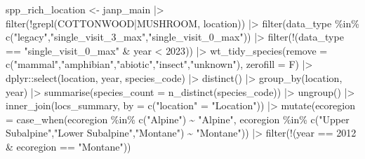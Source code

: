 \documentclass[
  letterpaper,
  DIV=11,
  numbers=noendperiod]{scrartcl}
\newenvironment{Shaded}{\begin{snugshade}}{\end{snugshade}}
\newcommand{\AttributeTok}[1]{\textcolor[rgb]{0.40,0.45,0.13}{#1}}
\newcommand{\DecValTok}[1]{\textcolor[rgb]{0.68,0.00,0.00}{#1}}
\newcommand{\FunctionTok}[1]{\textcolor[rgb]{0.28,0.35,0.67}{#1}}
\newcommand{\NormalTok}[1]{\textcolor[rgb]{0.00,0.23,0.31}{#1}}
\newcommand{\OtherTok}[1]{\textcolor[rgb]{0.00,0.23,0.31}{#1}}
\newcommand{\SpecialCharTok}[1]{\textcolor[rgb]{0.37,0.37,0.37}{#1}}
\newcommand{\StringTok}[1]{\textcolor[rgb]{0.13,0.47,0.30}{#1}}
\begin{document}
\begin{Shaded}
\begin{Highlighting}[]
\NormalTok{spp\_rich\_location }\OtherTok{\textless{}{-}}\NormalTok{ janp\_main }\SpecialCharTok{|\textgreater{}}
  \FunctionTok{filter}\NormalTok{(}\SpecialCharTok{!}\FunctionTok{grepl}\NormalTok{(}\StringTok{\textquotesingle{}COTTONWOOD|MUSHROOM\textquotesingle{}}\NormalTok{, location)) }\SpecialCharTok{|\textgreater{}}
  \FunctionTok{filter}\NormalTok{(data\_type }\SpecialCharTok{\%in\%} \FunctionTok{c}\NormalTok{(}\StringTok{"legacy"}\NormalTok{,}\StringTok{"single\_visit\_3\_max"}\NormalTok{,}\StringTok{"single\_visit\_0\_max"}\NormalTok{)) }\SpecialCharTok{|\textgreater{}}
  \FunctionTok{filter}\NormalTok{(}\SpecialCharTok{!}\NormalTok{(data\_type }\SpecialCharTok{==} \StringTok{"single\_visit\_0\_max"} \SpecialCharTok{\&}\NormalTok{ year }\SpecialCharTok{\textless{}} \DecValTok{2023}\NormalTok{)) }\SpecialCharTok{|\textgreater{}}
  \FunctionTok{wt\_tidy\_species}\NormalTok{(}\AttributeTok{remove =} \FunctionTok{c}\NormalTok{(}\StringTok{"mammal"}\NormalTok{,}\StringTok{"amphibian"}\NormalTok{,}\StringTok{"abiotic"}\NormalTok{,}\StringTok{"insect"}\NormalTok{,}\StringTok{"unknown"}\NormalTok{), }\AttributeTok{zerofill =}\NormalTok{ F) }\SpecialCharTok{|\textgreater{}}
\NormalTok{  dplyr}\SpecialCharTok{::}\FunctionTok{select}\NormalTok{(location, year, species\_code) }\SpecialCharTok{|\textgreater{}}
  \FunctionTok{distinct}\NormalTok{() }\SpecialCharTok{|\textgreater{}}
  \FunctionTok{group\_by}\NormalTok{(location, year) }\SpecialCharTok{|\textgreater{}}
  \FunctionTok{summarise}\NormalTok{(}\AttributeTok{species\_count =} \FunctionTok{n\_distinct}\NormalTok{(species\_code)) }\SpecialCharTok{|\textgreater{}}
  \FunctionTok{ungroup}\NormalTok{() }\SpecialCharTok{|\textgreater{}}
  \FunctionTok{inner\_join}\NormalTok{(locs\_summary, }\AttributeTok{by =} \FunctionTok{c}\NormalTok{(}\StringTok{"location"} \OtherTok{=} \StringTok{"Location"}\NormalTok{)) }\SpecialCharTok{|\textgreater{}}
  \FunctionTok{mutate}\NormalTok{(}\AttributeTok{ecoregion =} \FunctionTok{case\_when}\NormalTok{(ecoregion }\SpecialCharTok{\%in\%} \FunctionTok{c}\NormalTok{(}\StringTok{"Alpine"}\NormalTok{) }\SpecialCharTok{\textasciitilde{}} \StringTok{"Alpine"}\NormalTok{,}
\NormalTok{                               ecoregion }\SpecialCharTok{\%in\%} \FunctionTok{c}\NormalTok{(}\StringTok{"Upper Subalpine"}\NormalTok{,}\StringTok{"Lower Subalpine"}\NormalTok{,}\StringTok{"Montane"}\NormalTok{) }\SpecialCharTok{\textasciitilde{}} \StringTok{"Montane"}\NormalTok{)) }\SpecialCharTok{|\textgreater{}}
  \FunctionTok{filter}\NormalTok{(}\SpecialCharTok{!}\NormalTok{(year }\SpecialCharTok{==} \DecValTok{2012} \SpecialCharTok{\&}\NormalTok{ ecoregion }\SpecialCharTok{==} \StringTok{"Montane"}\NormalTok{))}


\end{Highlighting}
\end{Shaded}
\end{document}
